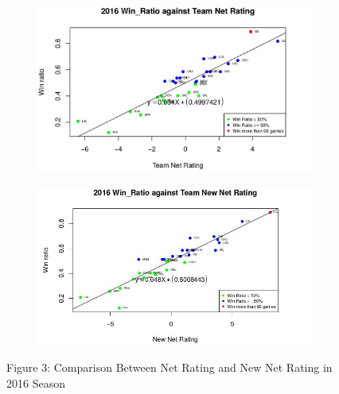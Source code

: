 \documentclass[11pt]{article}
\begin{document}
\begin{figure}[h!]
  \centering
  \begin{subfigure}[b]{0.45\linewidth}
    \includegraphics[width=\linewidth]{nr_16.jpg}
  \end{subfigure}
  \begin{subfigure}[b]{0.45\linewidth}
    \includegraphics[width=\linewidth]{new_nr_16.jpg}
  \end{subfigure}


\bigskip

Figure 3: Comparison Between Net Rating and New Net Rating in 2016 Season
\end{figure}
\end{document}
